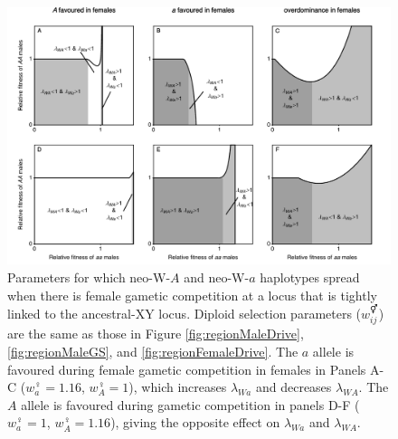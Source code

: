 \documentclass[12pt]{article}
\begin{document}
\begin{figure}[!h]
\centering
\centerline{\includegraphics[width=\linewidth]{Region_Plot_combined_FemaleGS}}
\caption{
Parameters for which neo-W-$A$ and neo-W-$a$ haplotypes spread when there is female gametic competition at a locus that is tightly linked to the ancestral-XY locus.
Diploid selection parameters ($w_{ij}^\Hermaphrodite$) are the same as those in Figure \ref{fig:regionMaleDrive}, \ref{fig:regionMaleGS}, and \ref{fig:regionFemaleDrive}. 
The $a$ allele is favoured during female gametic competition in females in Panels A-C ($w_{a}^\female=1.16$, $w_{A}^\female=1$), which increases $\lambda_{Wa}$ and decreases $\lambda_{WA}$. 
The $A$ allele is favoured during gametic competition in panels D-F ($w_{a}^\female=1$, $w_{A}^\female=1.16$), giving the opposite effect on $\lambda_{Wa}$ and $\lambda_{WA}$. 
}
\label{fig:regionFemaleGS}
\end{figure}
\end{document}
